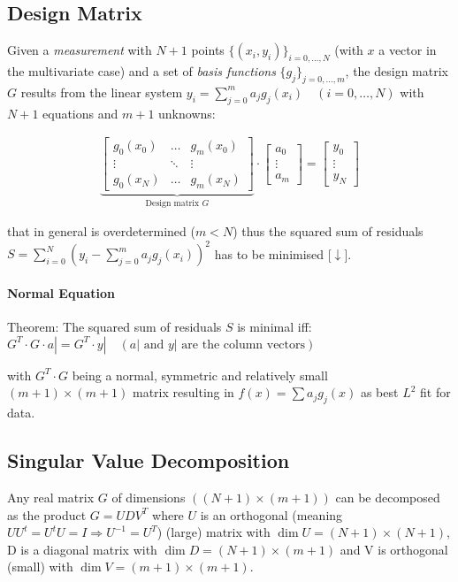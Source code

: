 \subsection{Design Matrix}
Given a \emph{measurement} with $N+1$ points $\{(x_i,y_i)\}_{i=0,\ldots,N}$ (with $x$ a vector in the multivariate case)
and a set of \emph{basis functions} $\{g_j\}_{j=0,\ldots,m}$,
the design matrix $G$ results from the linear system
$y_i=\sum_{j=0}^ma_jg_j(x_i)\quad(i=0,\ldots,N)$ with $N+1$ equations and $m+1$ unknowns:

\begin{snugshade*}
    \begin{align*}
        \underbrace{
            \begin{bmatrix}
                g_0(x_0) & \hdots & g_m(x_0) \\
                \vdots   & \ddots & \vdots   \\
                g_0(x_N) & \hdots & g_m(x_N)
            \end{bmatrix}
        }_{\text{Design matrix }G}
        \cdot
        \begin{bmatrix}
            a_0    \\
            \vdots \\
            a_m
        \end{bmatrix}
        =
        \begin{bmatrix}
            y_0    \\
            \vdots \\
            y_N
        \end{bmatrix}
    \end{align*}
\end{snugshade*}
that in general is overdetermined ($m<N$) thus the squared sum of residuals
$S=\sum_{i=0}^{N}\left(y_{i}-\sum_{j=0}^{m}a_{j}g_{j}(x_{i})\right)^{2}$
has to be minimised [$\downarrow$].

\paragraph{Normal Equation} Theorem: The squared sum of residuals $S$ is minimal iff:
\colorbox{shadecolor}{$
G^T\cdot G\cdot a| = G^T\cdot y|\quad (a|\text{ and }y|\text{ are the column vectors})
$}

with $G^T\cdot G$ being a normal,
symmetric and relatively small $(m+1)\times(m+1)$ matrix resulting in $f(x)=\sum a_jg_j(x)$ as best $L^2$ fit for data.

\subsection{Singular Value Decomposition}
Any real matrix $G$ of dimensions $((N+1)\times (m+1))$ can be decomposed as the product $G=UDV^T$
where $U$ is an orthogonal (meaning $UU^t=U^tU=I\Rightarrow U^{-1}=U^T$) (large) matrix with $\dim U = (N+1)\times (N+1)$,
D is a diagonal matrix with $\dim D = (N+1)\times (m+1)$ and
V is orthogonal (small) with $\dim V = (m+1)\times (m+1)$.

